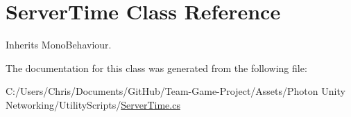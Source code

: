 \hypertarget{class_server_time}{}\section{Server\+Time Class Reference}
\label{class_server_time}


Inherits Mono\+Behaviour.



The documentation for this class was generated from the following file\+:\begin{DoxyCompactItemize}
\item 
C\+:/\+Users/\+Chris/\+Documents/\+Git\+Hub/\+Team-\/\+Game-\/\+Project/\+Assets/\+Photon Unity Networking/\+Utility\+Scripts/\hyperlink{_server_time_8cs}{Server\+Time.\+cs}\end{DoxyCompactItemize}
